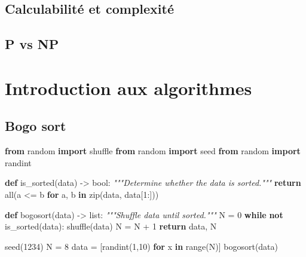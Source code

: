 \documentclass[
  letterpaper,
]{scrbook}
\newenvironment{Shaded}{\begin{snugshade}}{\end{snugshade}}
\newcommand{\BuiltInTok}[1]{\textcolor[rgb]{0.00,0.50,0.00}{#1}}
\newcommand{\CommentTok}[1]{\textcolor[rgb]{0.38,0.63,0.69}{\textit{#1}}}
\newcommand{\ControlFlowTok}[1]{\textcolor[rgb]{0.00,0.44,0.13}{\textbf{#1}}}
\newcommand{\DecValTok}[1]{\textcolor[rgb]{0.25,0.63,0.44}{#1}}
\newcommand{\ImportTok}[1]{\textcolor[rgb]{0.00,0.50,0.00}{\textbf{#1}}}
\newcommand{\KeywordTok}[1]{\textcolor[rgb]{0.00,0.44,0.13}{\textbf{#1}}}
\newcommand{\NormalTok}[1]{\textcolor[rgb]{0.00,0.44,0.13}{#1}}
\newcommand{\OperatorTok}[1]{\textcolor[rgb]{0.40,0.40,0.40}{#1}}
\theoremstyle{plain}
\theoremstyle{definition}
\theoremstyle{definition}
\theoremstyle{remark}
\begin{document}
\hypertarget{calculabilituxe9-et-complexituxe9}{%
\section{Calculabilité et
complexité}\label{calculabilituxe9-et-complexituxe9}}

\hypertarget{p-vs-np}{%
\section{P vs NP}\label{p-vs-np}}


\hypertarget{introduction-aux-algorithmes}{%
\chapter{Introduction aux
algorithmes}\label{introduction-aux-algorithmes}}

\hypertarget{bogo-sort}{%
\section{Bogo sort}\label{bogo-sort}}

\begin{Shaded}
\begin{Highlighting}[]
\ImportTok{from}\NormalTok{ random }\ImportTok{import}\NormalTok{ shuffle}
\ImportTok{from}\NormalTok{ random }\ImportTok{import}\NormalTok{ seed}
\ImportTok{from}\NormalTok{ random }\ImportTok{import}\NormalTok{ randint}

\KeywordTok{def}\NormalTok{ is\_sorted(data) }\OperatorTok{{-}\textgreater{}} \BuiltInTok{bool}\NormalTok{:}
    \CommentTok{"""Determine whether the data is sorted."""}
    \ControlFlowTok{return} \BuiltInTok{all}\NormalTok{(a }\OperatorTok{\textless{}=}\NormalTok{ b }\ControlFlowTok{for}\NormalTok{ a, b }\KeywordTok{in} \BuiltInTok{zip}\NormalTok{(data, data[}\DecValTok{1}\NormalTok{:]))}

\KeywordTok{def}\NormalTok{ bogosort(data) }\OperatorTok{{-}\textgreater{}} \BuiltInTok{list}\NormalTok{:}
    \CommentTok{"""Shuffle data until sorted."""}
\NormalTok{    N }\OperatorTok{=} \DecValTok{0}
    \ControlFlowTok{while} \KeywordTok{not}\NormalTok{ is\_sorted(data):}
\NormalTok{        shuffle(data)}
\NormalTok{        N }\OperatorTok{=}\NormalTok{ N }\OperatorTok{+} \DecValTok{1}
    \ControlFlowTok{return}\NormalTok{ data, N}

\NormalTok{seed(}\DecValTok{1234}\NormalTok{)}
\NormalTok{N }\OperatorTok{=} \DecValTok{8}
\NormalTok{data }\OperatorTok{=}\NormalTok{ [randint(}\DecValTok{1}\NormalTok{,}\DecValTok{10}\NormalTok{) }\ControlFlowTok{for}\NormalTok{ x }\KeywordTok{in} \BuiltInTok{range}\NormalTok{(N)]}
\NormalTok{bogosort(data)}
\end{Highlighting}
\end{Shaded}
\end{document}
